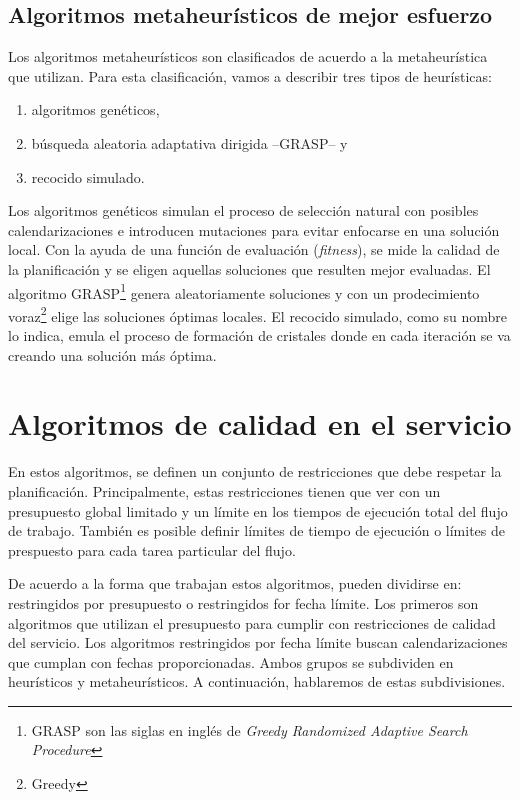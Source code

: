 \subsection{Algoritmos metaheurísticos de mejor esfuerzo}

Los algoritmos metaheurísticos son clasificados de acuerdo a la metaheurística que utilizan. Para esta clasificación, vamos a describir tres tipos de heurísticas: 

\begin{enumerate}
\item{algoritmos genéticos,}
\item{búsqueda aleatoria adaptativa dirigida --GRASP-- y}
\item{recocido simulado.}
\end{enumerate}

Los algoritmos genéticos simulan el proceso de selección natural con posibles calendarizaciones e introducen mutaciones para evitar enfocarse en una solución local. Con la ayuda de una función de evaluación (\emph{fitness}), se mide la calidad de la planificación y se eligen aquellas soluciones que resulten mejor evaluadas. El algoritmo GRASP\footnote{GRASP son las siglas en inglés de \emph{Greedy Randomized Adaptive Search Procedure}} genera aleatoriamente soluciones y con un prodecimiento voraz\footnote{Greedy} elige las soluciones óptimas locales. El recocido simulado, como su nombre lo indica, emula el proceso de formación de cristales donde en cada iteración se va creando una solución más óptima.

\section{Algoritmos de calidad en el servicio}
En estos algoritmos, se definen un conjunto de restricciones que debe respetar la planificación. Principalmente, estas restricciones tienen que ver con un presupuesto global limitado y un límite en los tiempos de ejecución total del flujo de trabajo. También es posible definir límites de tiempo de ejecución o límites de prespuesto para cada tarea particular del flujo.

De acuerdo a la forma que trabajan estos algoritmos, pueden dividirse en: restringidos por presupuesto o restringidos for fecha límite. Los primeros son algoritmos que utilizan el presupuesto para cumplir con restricciones de calidad del servicio. Los algoritmos restringidos por fecha límite buscan calendarizaciones que cumplan con fechas proporcionadas. Ambos grupos se subdividen en heurísticos y metaheurísticos. A continuación, hablaremos de estas subdivisiones.

